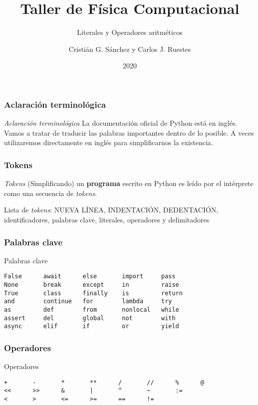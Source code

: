 \documentclass{beamer}
\title{Taller de Física Computacional}
\subtitle{Literales y Operadores aritméticos}
\author{Cristián G. Sánchez y Carlos J. Ruestes}
\date{2020}
\begin{document}
\frame{\titlepage}

\begin{frame}
\frametitle{Aclaración terminológica}
\begin{block}{{\em Aclaración terminológica}}
La documentación oficial de Python está en inglés. Vamos a tratar de traducir las palabras importantes dentro de lo posible. A veces utilizaremos directamente en inglés para simplificarnos la existencia.
\end{block}
\end{frame}

\begin{frame}
\frametitle{Tokens}
\begin{block}{{\em Tokens}}
(Simplificando) un {\bf programa} escrito en Python es leído por el intérprete como una secuencia de {\em tokens}.
\end{block}
\begin{block}{Lista de {\em tokens}:}
NUEVA LÍNEA, INDENTACIÓN, DEDENTACIÓN, identificadores, palabras clave, literales, operadores y delimitadores
\end{block}
\end{frame}

\begin{frame}[fragile]
\frametitle{Palabras clave}
\begin{block}{{Palabras clave}}
\begin{verbatim}
False      await      else       import     pass
None       break      except     in         raise
True       class      finally    is         return
and        continue   for        lambda     try
as         def        from       nonlocal   while
assert     del        global     not        with
async      elif       if         or         yield
\end{verbatim}
\end{block}
\end{frame}

\begin{frame}[fragile]
\frametitle{Operadores}
\begin{block}{{Operadores}}
\begin{verbatim}
+       -       *       **      /       //      %      @
<<      >>      &       |       ^       ~       :=
<       >       <=      >=      ==      !=
\end{verbatim}
\end{block}
\end{frame}
\end{document}
